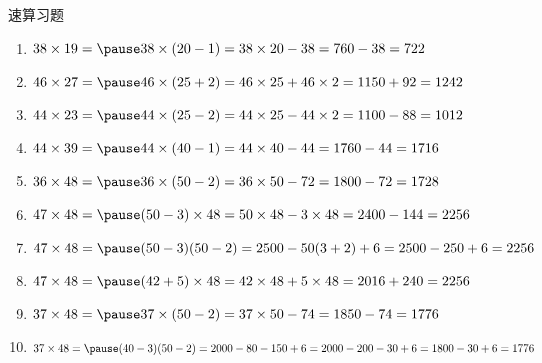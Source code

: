 \documentclass[aspectratio=169]{ctexbeamer} %
\begin{document}
\begin{frame}[t]{速算习题}
\begin{spacing}{1.2}
\normalsize
\begin{enumerate}[label={\arabic*.}]
\item $ 38 \times 19 = \pause 38 \times (20-1) = 38 \times 20 - 38 = 760 - 38 = 722$
\item $ 46 \times 27 = \pause 46 \times (25+2) = 46 \times 25 + 46 \times 2 = 1150 + 92 = 1242$
\item $ 44 \times 23 = \pause 44 \times (25-2) = 44 \times 25 - 44 \times 2 = 1100 - 88 = 1012$
\item $ 44 \times 39 = \pause 44 \times (40-1) = 44 \times 40 - 44 = 1760 -44 = 1716$
\item $ 36 \times 48 = \pause 36 \times (50-2) = 36 \times 50 - 72 = 1800 - 72 = 1728$
\item $ 47 \times 48 = \pause (50-3) \times 48 = 50 \times 48 - 3 \times 48 = 2400 - 144 = 2256$
\item $ 47 \times 48 = \pause (50-3)(50-2) = 2500 - 50(3+2) + 6 = 2500 - 250 + 6 = 2256$
\item $ 47 \times 48 = \pause (42+5) \times 48 = 42 \times 48 + 5 \times 48 =  2016 + 240 = 2256$
\item $ 37 \times 48 = \pause 37 \times (50-2) = 37 \times 50 - 74 = 1850 - 74 = 1776$
\item $ 37 \times 48 = \pause (40-3)(50-2) = 2000 - 80 - 150 + 6 = 2000 - 200 - 30 + 6 = 1800 - 30 + 6 = 1776$
\end{enumerate}

\end{spacing}
\end{frame}
\end{document}
